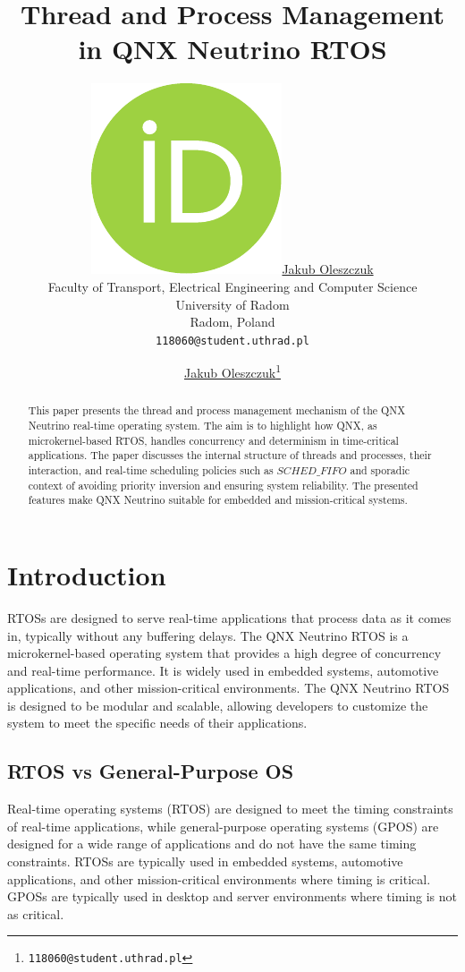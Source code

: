 \documentclass{article}
\title{Thread and Process Management in QNX Neutrino RTOS}
\author{ 
	\href{https://orcid.org/0009-0000-3709-0802}{\includegraphics[scale=0.06]{orcid.pdf}\hspace{1mm}Jakub Oleszczuk} \\
	Faculty of Transport, Electrical Engineering and Computer Science\\
	University of Radom\\
	Radom, Poland \\
	\texttt{118060@student.uthrad.pl} \\
}
\author[1]{%
	\href{https://orcid.org/0009-0000-3709-0802}{\usebox{\orcid}\hspace{1mm}Jakub Oleszczuk\thanks{\texttt{118060@student.uthrad.pl}}}%
}
\affil[1]{Faculty of Transport, Electrical Engineering and Computer Science, University of Radom, Radom,26-600, Poland}
\begin{document}
\maketitle

\begin{abstract}
	\label{sec:abstract}

	This paper presents the thread and process management mechanism of the QNX Neutrino real-time operating system.
	The aim is to highlight how QNX, as microkernel-based RTOS, handles concurrency and determinism in time-critical applications.
	The paper discusses the internal structure of threads and processes, their interaction, and real-time scheduling policies such as $SCHED\_FIFO$
	and sporadic context of avoiding priority inversion and ensuring system reliability. The presented features make QNX Neutrino suitable for
	embedded and mission-critical systems.

\end{abstract}




\section{Introduction}
\label{sec:intro}
RTOSs are designed to serve real-time applications that process data as it comes in, typically without any buffering delays.
The QNX Neutrino RTOS \citep{WhatsRTOS2024} is a microkernel-based operating system that provides a high degree of concurrency and real-time performance.
It is widely used in embedded systems, automotive applications, and other mission-critical environments.
The QNX Neutrino RTOS is designed to be modular and scalable, allowing developers to customize the system to meet the specific needs of their applications.

\subsection{RTOS vs General-Purpose OS}
\label{sec:rtos-vs-gpos}
Real-time operating systems (RTOS) are designed to meet the timing constraints of real-time applications, while general-purpose operating systems (GPOS) are designed for a wide range of applications and do not have the same timing constraints.
RTOSs are typically used in embedded systems, automotive applications, and other mission-critical environments where timing is critical.
GPOSs are typically used in desktop and server environments where timing is not as critical.
\end{document}
